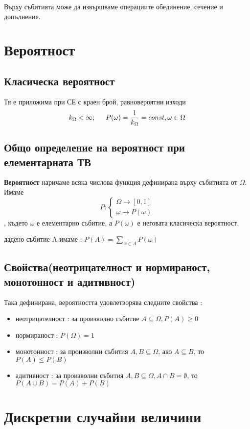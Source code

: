 \documentclass[fleqn,12pt]{article}
\begin{document}
\begin{justify}
Върху събитията може да извършваме операциите обединение, сечение и допълнение.

\section{Вероятност}
\subsection{Класическа вероятност}
Тя е приложима при СЕ с краен брой, равновероятни изходи
\begin{gather*}
    k_\Omega < \infty; \indent P(\omega) = \frac{1}{k_\Omega} = const, \omega \in \Omega
\end{gather*}
\subsection{Общо определение на вероятност при елементарната ТВ}
\textbf{Вероятност} наричаме всяка числова функция дефинирана върху събитията от $\Omega$. Имаме
\[P : \begin{cases}
    \Omega \rightarrow [0, 1]\\
    \omega \rightarrow P(\omega)
\end{cases}
\]
, където $\omega$ е елементарно събитие, а $P(\omega)$ е неговата класическа вероятност.

 дадено събитие A имаме : $P(A) = \sum_{w \in A} P(\omega)$
    
\subsection{Свойства(неотрицателност и нормираност, монотонност и адитивност)}
Така дефинирана, вероятността удовлетворява следните свойства : 
\begin{itemize}
    \item неотрицателност : за произволно събитие $A \subseteq \Omega, P(A) \geq 0$
    \item нормираност : $P(\Omega) = 1$
    \item монотонност : за произволни събития $A,B \subseteq \Omega$, ако $A \subseteq B$, то $P(A) \leq P(B)$
    \item адитивност : за произволни събития $A,B \subseteq \Omega, A \cap B = \emptyset$, то $P(A \cup B) = P(A) + P(B)$
\end{itemize}

\section{Дискретни случайни величини}

\end{justify}
\end{document}
